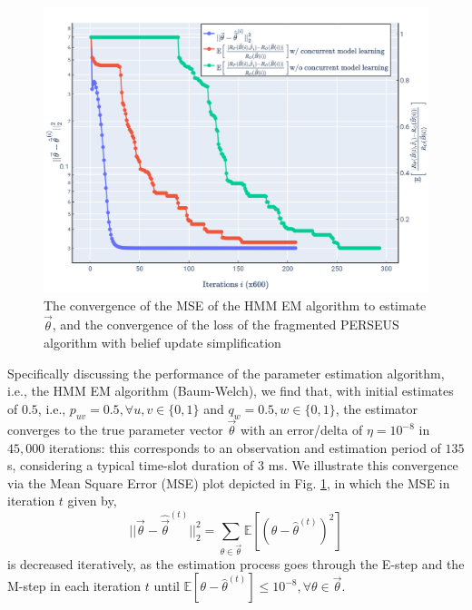 \documentclass[12pt, draftcls, onecolumn]{IEEEtran}
\begin{document}
\begin{figure} [htb]
    \centerline{
    \includegraphics[width = 0.8\linewidth]{figures/HMM_EM_Speed_Up.PNG}}
    \caption{The convergence of the MSE of the HMM EM algorithm to estimate $\vec{\theta}$, and the convergence of the loss of the fragmented PERSEUS algorithm with belief update simplification}
    \label{Fig. 7}
\end{figure}

Specifically discussing the performance of the parameter estimation algorithm, i.e., the HMM EM algorithm (Baum-Welch), we find that, with initial estimates of $0.5$, i.e., $p_{uv}{=}0.5,{\forall}u,v{\in}\{0,1\}$ and $q_{w}{=}0.5,w{\in}\{0,1\}$, the estimator converges to the true parameter vector $\vec{\theta}$ with an error/delta of $\eta{=}10^{-8}$ in $45,000$ iterations: this corresponds to an observation and estimation period of $135$ s, considering a typical time-slot duration of $3$ ms. We illustrate this convergence via the Mean Square Error (MSE) plot depicted in Fig. \ref{Fig. 7}, in which the MSE in iteration $t$ given by,
\begin{equation}\label{32}
    ||\vec{\theta}-\hat{\vec{\theta}}^{(t)}||_{2}^{2}=\sum_{\theta \in \vec{\theta}}\mathbb{E}[(\theta-\hat{\theta}^{(t)})^{2}]
\end{equation}
is decreased iteratively, as the estimation process goes through the E-step and the M-step in each iteration $t$ until $\mathbb{E}[\theta{-}\hat{\theta}^{(t)}]{\leq}10^{-8},{\forall}\theta{\in}\vec{\theta}$.
\end{document}
